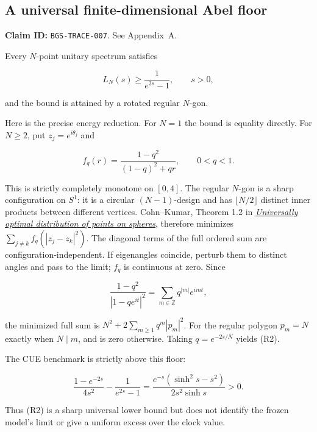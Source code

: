 \hypertarget{a-universal-finite-dimensional-abel-floor}{%
\subsection{A universal finite-dimensional Abel floor}\label{a-universal-finite-dimensional-abel-floor}}

\textbf{Claim ID:} \texttt{BGS-TRACE-007}. See Appendix~A.

\begin{theorem}\label{pass2:frontier-trace-007}

Every \(N\)-point unitary spectrum satisfies

\[
L_N(s)\ge \frac1{e^{2s}-1},\qquad s>0,                 \tag{R2}
\]

and the bound is attained by a rotated regular \(N\)-gon.

\end{theorem}

Here is the precise
energy reduction. For \(N=1\) the bound is equality directly. For \(N\ge2\), put
\(z_j=e^{i\theta_j}\) and

\[
f_q(r)=\frac{1-q^2}{(1-q)^2+qr},\qquad 0<q<1.
\]

This is strictly completely monotone on \([0,4]\). The regular \(N\)-gon is a
sharp configuration on \(S^1\): it is a circular \((N-1)\)-design and has
\(\lfloor N/2\rfloor\) distinct inner products between different vertices.
Cohn--Kumar, Theorem 1.2 in
\href{https://arxiv.org/abs/math/0607446v2}{\emph{Universally optimal distribution of points on spheres}},
therefore minimizes \(\sum_{j\ne k}f_q(|z_j-z_k|^2)\). The diagonal terms of
the full ordered sum are configuration-independent. If eigenangles
coincide, perturb them to distinct angles and pass to the limit; \(f_q\) is
continuous at zero. Since

\[
\frac{1-q^2}{|1-qe^{it}|^2}
=\sum_{m\in\mathbb Z}q^{|m|}e^{imt},
\]

the minimized full sum is \(N^2+2\sum_{m\ge1}q^m|p_m|^2\). For the regular
polygon \(p_m=N\) exactly when \(N\mid m\), and is zero otherwise. Taking
\(q=e^{-2s/N}\) yields (R2).

The CUE benchmark is strictly above this floor:

\[
\frac{1-e^{-2s}}{4s^2}-\frac1{e^{2s}-1}
=\frac{e^{-s}(\sinh^2s-s^2)}{2s^2\sinh s}>0.
\]

Thus (R2) is a sharp universal lower bound but does not identify the frozen
model's limit or give a uniform excess over the clock value.

